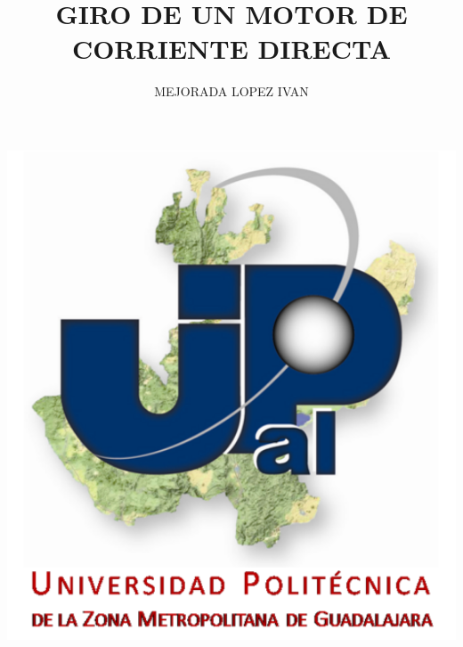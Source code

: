 \documentclass[12pt,a4paper]{article}
\author{MEJORADA LOPEZ IVAN}
\title{GIRO DE UN MOTOR DE CORRIENTE DIRECTA}
\begin{document}
\maketitle
\includegraphics[width=18cm]{UPZMG_Prueba_1b.png}
\newpage
\end{document}
